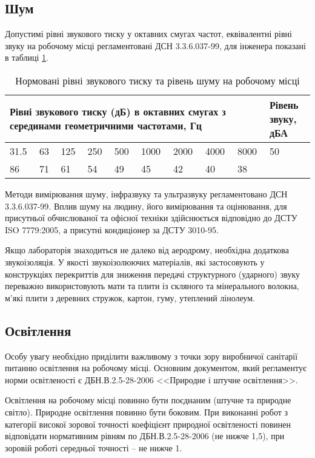 \subsection{Шум}

Допустимі рівні звукового тиску у октавних смугах частот, еквівалентні рівні звуку на робочому місці регламентовані ДСН 3.3.6.037-99, для інженера показані в таблиці \ref{tb:noise}.
\begin{table}[H]
\small
\caption{Нормовані рівні звукового тиску та рівень шуму на робочому місці}
\centering
\begin{tabular}{|p{0.4in}|p{0.4in}|p{0.4in}|p{0.4in}|p{0.4in}|p{0.4in}|p{0.4in}|p{0.4in}|p{0.4in}|p{0.4in}|} \hline 
\multicolumn{9}{|p{4in}|}{Рівні звукового тиску (дБ) в  октавних смугах з серединами геометричними частотами, Гц} & Рівень звуку, дБА \\ \hline 
31.5 & 63 & 125 & 250 & 500 & 1000 & 2000 & 4000 & 8000 & 50 \\ \hline 
86 & 71 & 61 & 54 & 49 & 45 & 42 & 40 & 38 &  \\ \hline 
\end{tabular}
\label{tb:noise}
\end{table}
Методи вимірювання шуму, інфразвуку та ультразвуку регламентовано ДСН 3.3.6.037-99. Вплив шуму на людину, його вимірювання та оцінювання, для присутньої обчислюваної та офісної техніки здійснюється відповідно до ДСТУ ISO 7779:2005, а присутні кондиціонер за ДСТУ 3010-95. 

Якщо лабораторія знаходиться не далеко від аеродрому, необхідна додаткова звукоізоляція. У якості звукоізолюючих матеріалів, які застосовують у конструкціях перекриттів для зниження передачі структурного (ударного) звуку переважно використовують мати та плити із скляного та мінерального волокна, м'які плити з деревних стружок, картон, гуму, утеплений лінолеум.

\subsection{Освітлення}
Особу увагу необхідно приділити важливому з точки зору виробничої санітарії питанню освітлення на робочому місці. Основним документом, який регламентує норми освітленості є ДБН.В.2.5-28-2006 <<Природне і штучне освітлення>>. 

Освітлення на робочому місці повинно бути поєднаним (штучне та природне світло). 
Природне освітлення повинно бути боковим. При виконанні робот з категорії високої 
зорової точності коефіцієнт природної освітленості повинен відповідати нормативним 
рівням по ДБН.В.2.5-28-2006 (не нижче 1,5), при зоровій роботі середньої точності – не нижче 1.

